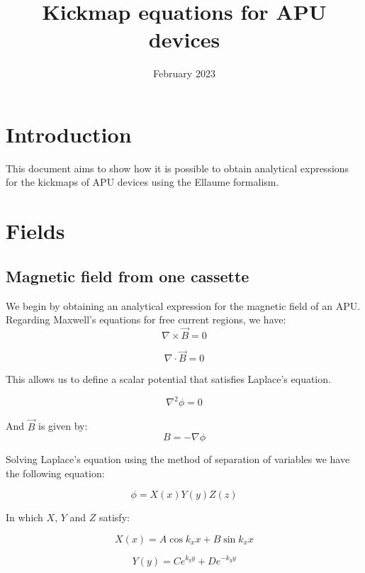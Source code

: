 \documentclass{article}
\title{Kickmap equations for APU devices}
\author{}
\date{February 2023}
\begin{document}
\maketitle

\section{Introduction}
\par This document aims to show how it is possible to obtain analytical expressions for the kickmaps of APU devices using the Ellaume formalism.

\section{Fields}
\subsection{Magnetic field from one cassette}
We begin by obtaining an analytical expression for the magnetic field of an APU.
Regarding Maxwell's equations for free current regions, we have:
\begin{equation}
\nabla \times \vec{B} = 0
\end{equation}

\begin{equation}
\nabla \cdot \vec{B} = 0
\end{equation}

This allows us to define a scalar potential that satisfies Laplace's equation.

\begin{equation}
\nabla^{2} \phi = 0
\end{equation}

And $\vec{B}$ is given by:
\begin{equation}
B = -\nabla \phi
\end{equation}

Solving Laplace's equation using the method of separation of variables we have the following equation:

\begin{equation}
\phi = X(x)Y(y)Z(z)
\end{equation}

In which $X$, $Y$ and $Z$ satisfy:

\begin{equation}
X(x) = A\cos{k_xx} + B\sin{k_xx}
\end{equation}

\begin{equation}
Y(y) = Ce^{k_yy} + De^{-k_yy}
\end{equation}
\end{document}

